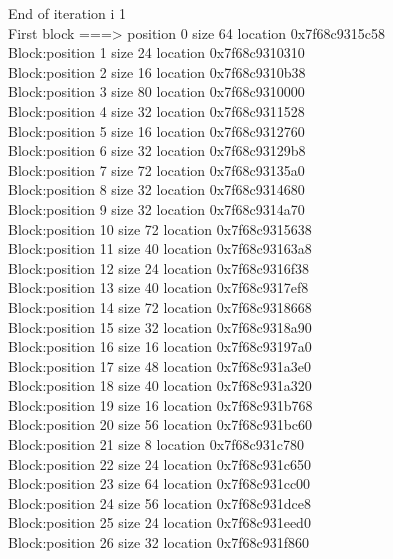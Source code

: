 \documentclass[a4paper,10pt]{article}
\begin{document}
End of iteration i 1\\
First block ===> position 0 size 64 location 0x7f68c9315c58\\
   Block:position 1 size 24 location 0x7f68c9310310\\
   Block:position 2 size 16 location 0x7f68c9310b38\\
   Block:position 3 size 80 location 0x7f68c9310000\\
   Block:position 4 size 32 location 0x7f68c9311528\\
   Block:position 5 size 16 location 0x7f68c9312760\\
   Block:position 6 size 32 location 0x7f68c93129b8\\
   Block:position 7 size 72 location 0x7f68c93135a0\\
   Block:position 8 size 32 location 0x7f68c9314680\\
   Block:position 9 size 32 location 0x7f68c9314a70\\
   Block:position 10 size 72 location 0x7f68c9315638\\
   Block:position 11 size 40 location 0x7f68c93163a8\\
   Block:position 12 size 24 location 0x7f68c9316f38\\
   Block:position 13 size 40 location 0x7f68c9317ef8\\
   Block:position 14 size 72 location 0x7f68c9318668\\
   Block:position 15 size 32 location 0x7f68c9318a90\\
   Block:position 16 size 16 location 0x7f68c93197a0\\
   Block:position 17 size 48 location 0x7f68c931a3e0\\
   Block:position 18 size 40 location 0x7f68c931a320\\
   Block:position 19 size 16 location 0x7f68c931b768\\
   Block:position 20 size 56 location 0x7f68c931bc60\\
   Block:position 21 size 8 location 0x7f68c931c780\\
   Block:position 22 size 24 location 0x7f68c931c650\\
   Block:position 23 size 64 location 0x7f68c931cc00\\
   Block:position 24 size 56 location 0x7f68c931dce8\\
   Block:position 25 size 24 location 0x7f68c931eed0\\
   Block:position 26 size 32 location 0x7f68c931f860\\
\end{document}

